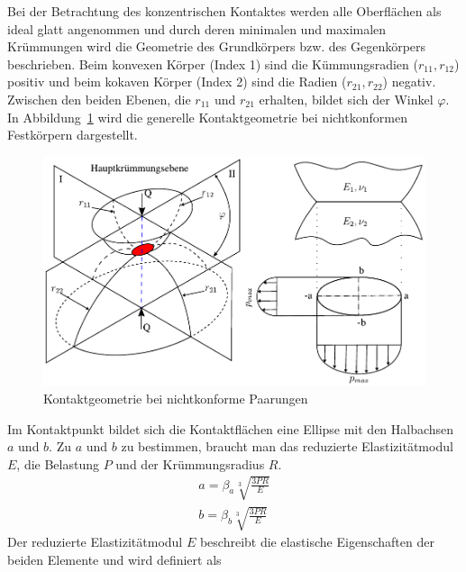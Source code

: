 Bei der Betrachtung des konzentrischen Kontaktes werden alle Oberflächen als ideal glatt angenommen und durch deren minimalen und maximalen Krümmungen wird die Geometrie des Grundkörpers bzw. des Gegenkörpers beschrieben.
Beim konvexen Körper (Index 1) sind die Kümmungsradien ($r_{11}, r_{12}$) positiv und beim kokaven Körper (Index 2) sind die Radien ($r_{21}, r_{22}$) negativ.
Zwischen den beiden Ebenen, die $r_{11}$ und $r_{21}$ erhalten, bildet sich der Winkel $\varphi$.
In Abbildung~\ref{fig:kontaktgeometrie_nichtkonforme_kontakte} wird die generelle Kontaktgeometrie bei nichtkonformen Festkörpern dargestellt.
\begin{figure}[htb]
    \centering
    \includegraphics[]{./images/Hertzsche_Pressung.pdf}
    \caption{Kontaktgeometrie bei nichtkonforme Paarungen\cite{psm}}
    \label{fig:kontaktgeometrie_nichtkonforme_kontakte}
\end{figure}
%
Im Kontaktpunkt bildet sich die Kontaktflächen eine Ellipse mit den Halbachsen $a$ und $b$.
Zu $a$ und $b$ zu bestimmen, braucht man das reduzierte Elastizitätmodul $E$, die Belastung $P$ und der Krümmungsradius $R$.
\begin{align}
    a = \beta_a  \sqrt[3]{\frac{3  P  R}{E}} \label{eq:laenge_a} \\
    b = \beta_b  \sqrt[3]{\frac{3  P  R}{E}} \label{eq:laenge_b}
\end{align}
%
Der reduzierte Elastizitätmodul $E$ beschreibt die elastische Eigenschaften der beiden Elemente und wird definiert als
